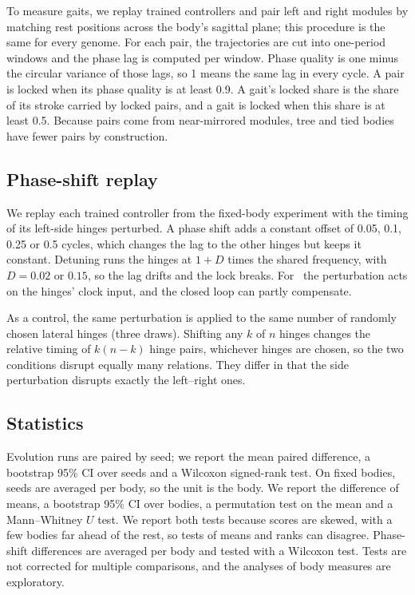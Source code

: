 To measure gaits, we replay trained controllers and pair left and right modules by matching rest positions across the body's sagittal plane; this procedure is the same for every genome. For each pair, the trajectories are cut into one-period windows and the phase lag is computed per window. Phase quality is one minus the circular variance of those lags, so 1 means the same lag in every cycle. A pair is locked when its phase quality is at least 0.9. A gait's locked share is the share of its stroke carried by locked pairs, and a gait is locked when this share is at least 0.5. Because pairs come from near-mirrored modules, tree and tied bodies have fewer pairs by construction.

\subsection{Phase-shift replay}
\label{sec:phase-shift}

We replay each trained controller from the fixed-body experiment with the timing of its left-side hinges perturbed. A phase shift adds a constant offset of 0.05, 0.1, 0.25 or 0.5 cycles, which changes the lag to the other hinges but keeps it constant. Detuning runs the hinges at $1 + D$ times the shared frequency, with $D = 0.02$ or $0.15$, so the lag drifts and the lock breaks. For \dann\ the perturbation acts on the hinges' clock input, and the closed loop can partly compensate.

As a control, the same perturbation is applied to the same number of randomly chosen lateral hinges (three draws). Shifting any $k$ of $n$ hinges changes the relative timing of $k(n-k)$ hinge pairs, whichever hinges are chosen, so the two conditions disrupt equally many relations. They differ in that the side perturbation disrupts exactly the left--right ones.

\subsection{Statistics}
\label{sec:stats}

Evolution runs are paired by seed; we report the mean paired difference, a bootstrap 95\% CI over seeds and a Wilcoxon signed-rank test. On fixed bodies, seeds are averaged per body, so the unit is the body. We report the difference of means, a bootstrap 95\% CI over bodies, a permutation test on the mean and a Mann--Whitney $U$ test. We report both tests because scores are skewed, with a few bodies far ahead of the rest, so tests of means and ranks can disagree. Phase-shift differences are averaged per body and tested with a Wilcoxon test. Tests are not corrected for multiple comparisons, and the analyses of body measures are exploratory.
